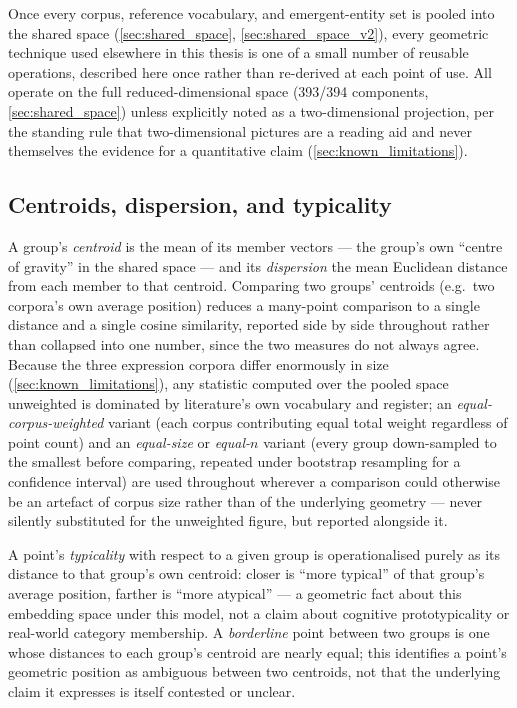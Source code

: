Once every corpus, reference vocabulary, and emergent-entity set is pooled into the shared space (\ref{sec:shared_space}, \ref{sec:shared_space_v2}), every geometric technique used elsewhere in this thesis is one of a small number of reusable operations, described here once rather than re-derived at each point of use. All operate on the full reduced-dimensional space (393/394 components, \ref{sec:shared_space}) unless explicitly noted as a two-dimensional projection, per the standing rule that two-dimensional pictures are a reading aid and never themselves the evidence for a quantitative claim (\ref{sec:known_limitations}).

\subsection{Centroids, dispersion, and typicality}
A group's \textit{centroid} is the mean of its member vectors — the group's own \enquote{centre of gravity} in the shared space — and its \textit{dispersion} the mean Euclidean distance from each member to that centroid. Comparing two groups' centroids (e.g.\ two corpora's own average position) reduces a many-point comparison to a single distance and a single cosine similarity, reported side by side throughout rather than collapsed into one number, since the two measures do not always agree. Because the three expression corpora differ enormously in size (\ref{sec:known_limitations}), any statistic computed over the pooled space unweighted is dominated by literature's own vocabulary and register; an \textit{equal-corpus-weighted} variant (each corpus contributing equal total weight regardless of point count) and an \textit{equal-size} or \textit{equal-$n$} variant (every group down-sampled to the smallest before comparing, repeated under bootstrap resampling for a confidence interval) are used throughout wherever a comparison could otherwise be an artefact of corpus size rather than of the underlying geometry — never silently substituted for the unweighted figure, but reported alongside it.

A point's \textit{typicality} with respect to a given group is operationalised purely as its distance to that group's own centroid: closer is \enquote{more typical} of that group's average position, farther is \enquote{more atypical} — a geometric fact about this embedding space under this model, not a claim about cognitive prototypicality or real-world category membership. A \textit{borderline} point between two groups is one whose distances to each group's centroid are nearly equal; this identifies a point's geometric position as ambiguous between two centroids, not that the underlying claim it expresses is itself contested or unclear.


